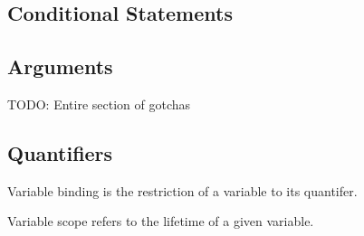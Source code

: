 
\subsection{Conditional Statements}



\subsection{Arguments}



TODO: Entire section of gotchas

\subsection{Quantifiers}



Variable binding is the restriction of a variable to its quantifer.

Variable scope refers to the lifetime of a given variable.



